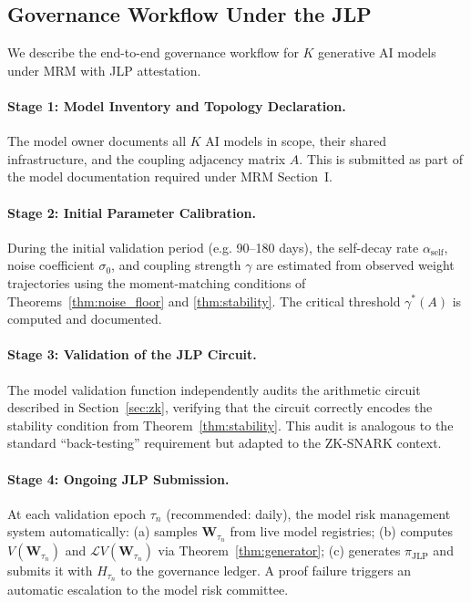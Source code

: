 \documentclass[12pt]{article}
\theoremstyle{plain}
\theoremstyle{definition}
\newcommand{\Lgen}{\mathcal{L}}
\newcommand{\W}{\mathbf{W}}
\begin{document}
\subsection{Governance Workflow Under the JLP}

We describe the end-to-end governance workflow for
$K$ generative AI models under MRM with JLP attestation.

\paragraph{Stage 1: Model Inventory and Topology Declaration.}
The model owner documents all $K$ AI models in scope, their
shared infrastructure, and the coupling adjacency matrix $A$.  This
is submitted as part of the model documentation required under
MRM Section~I.

\paragraph{Stage 2: Initial Parameter Calibration.}
During the initial validation period (e.g. 90--180 days), the
self-decay rate $\alpha_{\mathrm{self}}$, noise coefficient $\sigma_0$,
and coupling strength $\gamma$ are estimated from observed weight
trajectories using the moment-matching conditions of
Theorems~\ref{thm:noise_floor} and \ref{thm:stability}.  The critical
threshold $\gamma^*(A)$ is computed and documented.

\paragraph{Stage 3: Validation of the JLP Circuit.}
The model validation function independently audits the arithmetic
circuit described in Section~\ref{sec:zk}, verifying that the circuit
correctly encodes the stability condition from Theorem~\ref{thm:stability}.
This audit is analogous to the standard ``back-testing'' requirement but adapted to the ZK-SNARK context.

\paragraph{Stage 4: Ongoing JLP Submission.}
At each validation epoch $\tau_n$ (recommended: daily), the model
risk management system automatically:
(a) samples $\W_{\tau_n}$ from live model registries;
(b) computes $V(\W_{\tau_n})$ and $\Lgen V(\W_{\tau_n})$ via
Theorem~\ref{thm:generator};
(c) generates $\pi_{\mathrm{JLP}}$ and submits it with $H_{\tau_n}$
to the governance ledger.
A proof failure triggers an automatic escalation to the model risk
committee.
\end{document}
